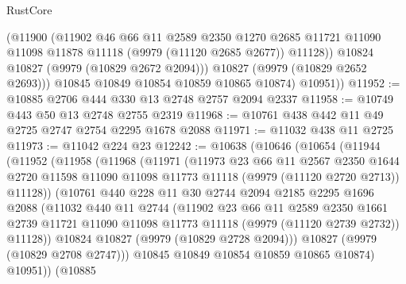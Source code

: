 \begin{lexlean}{RustCore}
\begin{coremodule}
              (@11900
                (@11902
                  @46
                  @66
                  @11
                  @2589
                  @2350
                  @1270
                  @2685
                  @11721
                  @11090
                  @11098
                  @11878
                  @11118
                  (@9979 (@11120 @2685 @2677))
                  @11128))
              @10824
              @10827
              (@9979 (@10829 @2672 @2094)))
            @10827
            (@9979 (@10829 @2652 @2693)))
          @10845
          @10849
          @10854
          @10859
          @10865
          @10874)
        @10951))
@11952 := @10885 @2706 @444 @330 @13 @2748 @2757 @2094 @2337
@11958 := @10749 @443 @50 @13 @2748 @2755 @2319
@11968 := @10761 @438 @442 @11 @49 @2725 @2747 @2754 @2295 @1678 @2088
@11971 := @11032 @438 @11 @2725
@11973 := @11042 @224 @23
@12242 := @10638
    (@10646
      (@10654
        (@11944
          (@11952
            (@11958
              (@11968
                (@11971
                  (@11973
                    @23
                    @66
                    @11
                    @2567
                    @2350
                    @1644
                    @2720
                    @11598
                    @11090
                    @11098
                    @11773
                    @11118
                    (@9979 (@11120 @2720 @2713))
                    @11128))
                (@10761
                  @440
                  @228
                  @11
                  @30
                  @2744
                  @2094
                  @2185
                  @2295
                  @1696
                  @2088
                  (@11032
                    @440
                    @11
                    @2744
                    (@11902
                      @23
                      @66
                      @11
                      @2589
                      @2350
                      @1661
                      @2739
                      @11721
                      @11090
                      @11098
                      @11773
                      @11118
                      (@9979 (@11120 @2739 @2732))
                      @11128))
                  @10824
                  @10827
                  (@9979 (@10829 @2728 @2094)))
                @10827
                (@9979 (@10829 @2708 @2747)))
              @10845
              @10849
              @10854
              @10859
              @10865
              @10874)
            @10951))
        (@10885

\end{coremodule}
\end{lexlean}
